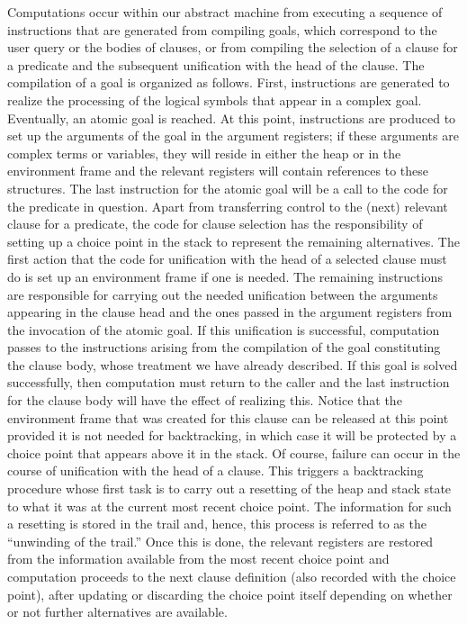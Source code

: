 Computations occur within our abstract machine from executing a sequence
of instructions that are generated from compiling goals, which
correspond to the user query or the bodies of clauses, or from
compiling the selection of a clause for a predicate and the subsequent
unification with the head of the clause.
The compilation of a goal
is organized as follows. First, instructions are generated to realize
the processing of the logical symbols that appear in a complex
goal. Eventually, an atomic goal is reached. At this point,
instructions are produced to set up the arguments of the
goal in the argument registers; if these arguments are complex
terms or variables, they will reside in either the heap or in the
environment frame and the relevant registers will contain references
to these structures. The last instruction for the atomic goal will be
a call to the code for the predicate in question.
Apart from transferring control to the (next) relevant clause for a
predicate, the code for clause selection has the responsibility of
setting up a choice point in the stack to represent the remaining
alternatives.
The first action that the code for unification with the head of a
selected clause must do is set up an environment frame if one is
needed. The remaining instructions are responsible for carrying out
the needed unification between the arguments appearing in the clause
head and the ones passed in the argument registers from the invocation
of the atomic goal. If this unification is successful, computation
passes to the instructions arising from the compilation of the goal
constituting the clause body, whose treatment we have already
described.
If this goal is solved successfully, then computation must return to
the caller and the last instruction for the clause body will have the
effect of realizing this. Notice that the environment frame that was
created for this clause can be released at this point provided it is
not needed for backtracking, in which case it will be protected by a
choice point that appears above it in the stack.
Of course, failure can occur in the course of unification with the
head of a clause. This triggers a backtracking procedure whose first
task is to carry out a resetting of the heap and stack state to what
it was at the current most recent choice point. The information for
such a resetting is stored in the trail and, hence, this process
is referred to as the ``unwinding of the trail.''  Once this is done,
the relevant registers are restored from the information available
from the most recent choice point and computation proceeds
to the next clause definition (also recorded with the choice point),
after updating or discarding the choice point itself depending on
whether or not further alternatives are available.


